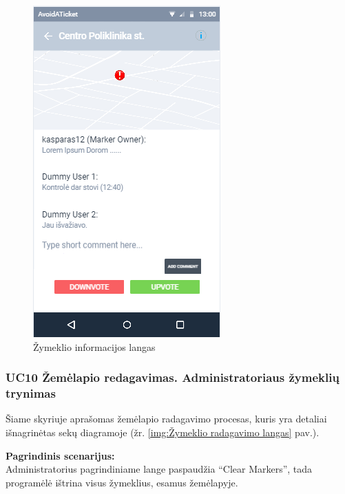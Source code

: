 \documentclass{VUMIFPSkursinis}
\begin{document}
	\begin{figure}[H]
				\centering
				\includegraphics[scale=0.6]{img/mockup_markerInfoWindow}
				\caption{Žymeklio informacijos langas}
				\label{img:Žymeklio informacijos langas}
			\end{figure}

\subsubsection{UC10 Žemėlapio redagavimas. Administratoriaus žymeklių trynimas}
	Šiame skyriuje aprašomas žemėlapio radagavimo procesas,  kuris yra detaliai išnagrinėtas sekų diagramoje (žr. \ref{img:Žymeklio radagavimo langas} pav.).

	\textbf{Pagrindinis scenarijus:}\\
	Administratorius pagrindiniame lange paspaudžia “Clear Markers”, tada programėlė ištrina visus žymeklius, esamus žemėlapyje.
\end{document}
